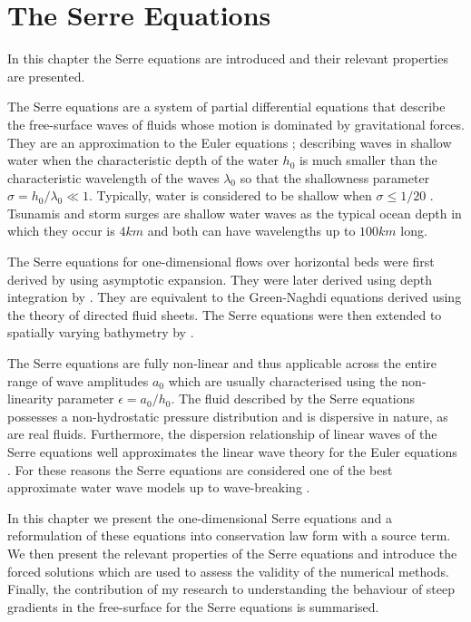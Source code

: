 
\chapter{The Serre Equations}
\label{chp:Serreeqns}
In this chapter the Serre equations are introduced and their relevant properties are presented.

The Serre equations are a system of partial differential equations that describe the free-surface waves of fluids whose motion is dominated by gravitational forces. They are an approximation to the Euler equations \cite{Euler-1755-274}; describing waves in shallow water when the characteristic depth of the water $h_0$ is much smaller than the characteristic wavelength of the waves $\lambda_0$ so that the shallowness parameter $ \sigma = h_0 / \lambda_0  \ll 1 $. Typically, water is considered to be shallow when $\sigma  \le  1/ 20$ \cite{Sorenson-2006}. Tsunamis and storm surges are shallow water waves as the typical ocean depth in which they occur is $4km$ and both can have wavelengths up to $100km$ long.

The Serre equations for one-dimensional flows over horizontal beds were first derived by \citet{Serre-F-1953-857} using asymptotic expansion. They were later derived using depth integration by \citet{Su-Gardener-1969-536}. They are equivalent to the Green-Naghdi equations \cite{Green-Naghdi-1976-237} derived using the theory of directed fluid sheets. The Serre equations were then extended to spatially varying bathymetry by \citet{Seabra-Santos-etal-1987-117}. 

The Serre equations are fully non-linear and thus applicable across the entire range of wave amplitudes $a_0$ which are usually characterised using the non-linearity parameter $\epsilon = a_0 / h_0$. The fluid described by the Serre equations possesses a non-hydrostatic pressure distribution and is dispersive in nature, as are real fluids. Furthermore, the dispersion relationship of linear waves of the Serre equations well approximates the linear wave theory for the Euler equations \cite{Barthelemy-2004-315}. For these reasons the Serre equations are considered one of the best approximate water wave models up to wave-breaking \cite{Bonneton-Lannes-2009-16601,Bonneton-etal-2011-1479}. 

In this chapter we present the one-dimensional Serre equations and a reformulation of these equations into conservation law form with a source term. We then present the relevant properties of the Serre equations and introduce the forced solutions which are used to assess the validity of the numerical methods. Finally, the contribution of my research \cite{Pitt-2018-61} to understanding the behaviour of steep gradients in the free-surface for the Serre equations is summarised. 


